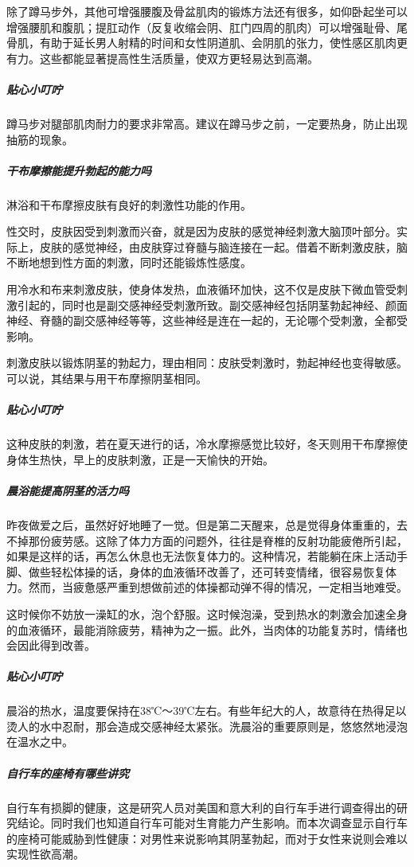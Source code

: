 \begin{enumerate}
除了蹲马步外，其他可增强腰腹及骨盆肌肉的锻炼方法还有很多，如仰卧起坐可以增强腰肌和腹肌；提肛动作（反复收缩会阴、肛门四周的肌肉）可以增强耻骨、尾骨肌，有助于延长男人射精的时间和女性阴道肌、会阴肌的张力，使性感区肌肉更有力。这些都能显著提高性生活质量，使双方更轻易达到高潮。

\subparagraph{贴心小叮咛}

蹲马步对腿部肌肉耐力的要求非常高。建议在蹲马步之前，一定要热身，防止出现抽筋的现象。

\subparagraph{干布摩擦能提升勃起的能力吗}

淋浴和干布摩擦皮肤有良好的刺激性功能的作用。

性交时，皮肤因受到刺激而兴奋，就是因为皮肤的感觉神经刺激大脑顶叶部分。实际上，皮肤的感觉神经，由皮肤穿过脊髓与脑连接在一起。借着不断刺激皮肤，脑不断地想到性方面的刺激，同时还能锻炼性感度。

用冷水和布来刺激皮肤，使身体发热，血液循环加快，这不仅是皮肤下微血管受刺激引起的，同时也是副交感神经受刺激所致。副交感神经包括阴茎勃起神经、颜面神经、脊髓的副交感神经等等，这些神经是连在一起的，无论哪个受刺激，全都受影响。

刺激皮肤以锻炼阴茎的勃起力，理由相同：皮肤受刺激时，勃起神经也变得敏感。可以说，其结果与用干布摩擦阴茎相同。

\subparagraph{贴心小叮咛}

这种皮肤的刺激，若在夏天进行的话，冷水摩擦感觉比较好，冬天则用干布摩擦使身体生热快，早上的皮肤刺激，正是一天愉快的开始。

\subparagraph{晨浴能提高阴茎的活力吗}

昨夜做爱之后，虽然好好地睡了一觉。但是第二天醒来，总是觉得身体重重的，去不掉那份疲劳感。这除了体力方面的问题外，往往是脊椎的反射功能疲倦所引起，如果是这样的话，再怎么休息也无法恢复体力的。这种情况，若能躺在床上活动手脚、做些轻松体操的话，身体的血液循环改善了，还可转变情绪，很容易恢复体力。然而，当疲惫感严重到想做前述的体操都动弹不得的情况，一定相当地难受。

这时候你不妨放一澡缸的水，泡个舒服。这时候泡澡，受到热水的刺激会加速全身的血液循环，最能消除疲劳，精神为之一振。此外，当肉体的功能复苏时，情绪也会因此得到改善。

\subparagraph{贴心小叮咛}

晨浴的热水，温度要保持在38℃～39℃左右。有些年纪大的人，故意待在热得足以烫人的水中忍耐，那会造成交感神经太紧张。洗晨浴的重要原则是，悠悠然地浸泡在温水之中。

\subparagraph{自行车的座椅有哪些讲究}

自行车有损脚的健康，这是研究人员对美国和意大利的自行车手进行调查得出的研究结论。同时我们也知道自行车可能对生育能力产生影响。而本次调查显示自行车的座椅可能威胁到性健康：对男性来说影响其阴茎勃起，而对于女性来说则会难以实现性欲高潮。


\end{enumerate}
